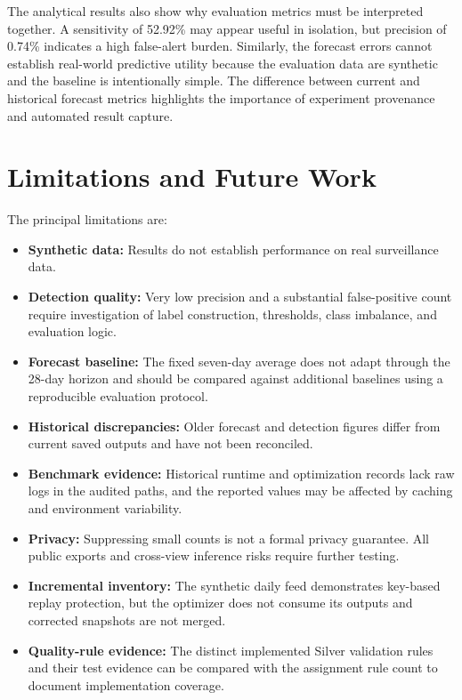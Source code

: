 \documentclass[conference]{IEEEtran}
\begin{document}
The analytical results also show why evaluation metrics must be interpreted together. A sensitivity of 52.92\% may appear useful in isolation, but precision of 0.74\% indicates a high false-alert burden. Similarly, the forecast errors cannot establish real-world predictive utility because the evaluation data are synthetic and the baseline is intentionally simple. The difference between current and historical forecast metrics highlights the importance of experiment provenance and automated result capture.

\section{Limitations and Future Work}

The principal limitations are:
\begin{itemize}
    \item \textbf{Synthetic data:} Results do not establish performance on real surveillance data.
    \item \textbf{Detection quality:} Very low precision and a substantial false-positive count require investigation of label construction, thresholds, class imbalance, and evaluation logic.
    \item \textbf{Forecast baseline:} The fixed seven-day average does not adapt through the 28-day horizon and should be compared against additional baselines using a reproducible evaluation protocol.
    \item \textbf{Historical discrepancies:} Older forecast and detection figures differ from current saved outputs and have not been reconciled.
    \item \textbf{Benchmark evidence:} Historical runtime and optimization records lack raw logs in the audited paths, and the reported values may be affected by caching and environment variability.
    \item \textbf{Privacy:} Suppressing small counts is not a formal privacy guarantee. All public exports and cross-view inference risks require further testing.
    \item \textbf{Incremental inventory:} The synthetic daily feed demonstrates key-based replay protection, but the optimizer does not consume its outputs and corrected snapshots are not merged.
    \item \textbf{Quality-rule evidence:} The distinct implemented Silver validation rules and their test evidence can be compared with the assignment rule count to document implementation coverage.
\end{itemize}
\end{document}
